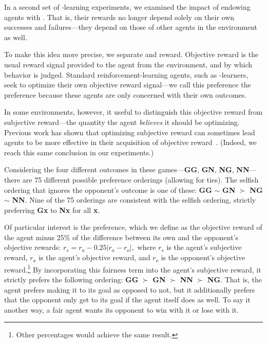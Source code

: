 
In a second set of \Q-learning experiments, we examined the impact of
endowing agents with . That is, their
rewards no longer depend solely on their own successes and
failures---they depend on those of other agents in the environment as
well.

To make this idea more precise, we separate  and
 reward. Objective reward is the usual reward
signal provided to the agent from the environment, and by which
behavior is judged. Standard reinforcement-learning agents, such
as \Q-learners, seek to optimize their own objective reward
signal---we call this preference the  preference
because these agents are only concerned with their own outcomes.

In some environments, however, it useful to distinguish this objective
reward from subjective reward---the quantity the agent \emph{believes}
it should be optimizing. Previous work has shown that optimizing
subjective reward can sometimes lead agents to be more effective in
their acquisition of objective reward~\cite{singh2009rewards}.  (Indeed, we
reach this same conclusion in our experiments.)

Considering the four different outcomes in these games---{\bf GG},
{\bf GN}, {\bf NG}, {\bf NN}---there are 75 different possible
preference orderings (allowing for ties). The selfish ordering that
ignores the opponent's outcome is one of these:
{\bf GG} $\sim$ {\bf GN} $\succ$ {\bf NG} $\sim$ {\bf NN}.
Nine of the 75 orderings are consistent with the selfish ordering,
strictly preferring {\bf Gx} to {\bf Nx} for all {\bf x}.

Of particular interest is the  preference, which we define
as the objective reward of the agent minus 25\% of the difference
between its own and the opponent's objective rewards:
$r_{s} = r_{a} - 0.25 \left| r_{a} - r_{o} \right|,$ where $r_{s}$
is the agent's subjective reward, $r_{a}$ is the agent's objective
reward, and $r_{o}$ is the opponent's objective reward.\footnote{Other
percentages would achieve the same result.}  By incorporating this
fairness term into the agent's subjective reward, it strictly prefers
the following ordering:
{\bf GG} $\succ$ \mbox{\bf GN} $\succ$ \mbox {\bf NN} $\succ$ {\bf NG}.
That is, the agent prefers making it to its goal as opposed to not,
but it additionally prefers that the opponent only get to its goal if
the agent itself does as well. To say it another way, a fair agent
wants its opponent to win with it or lose with it.

